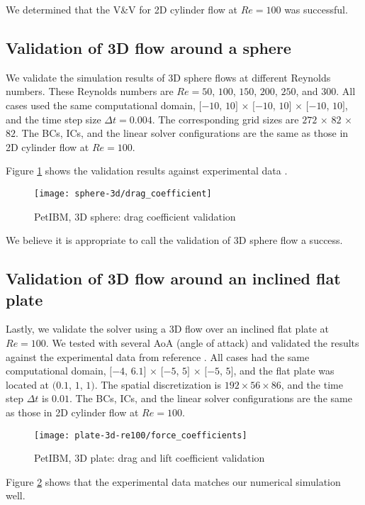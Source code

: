 We determined that the V\&V for 2D cylinder flow at $Re=100$ was successful.

\subsection*{Validation of 3D flow around a sphere}

We validate the simulation results of 3D sphere flows at different Reynolds numbers.
These Reynolds numbers are $Re=50$, $100$, $150$, $200$, $250$, and $300$.
All cases used the same computational domain, $[-10$, $10]$ $\times$ $[-10$, $10]$ $\times$ $[-10$, $10]$, and the time step size $\Delta t=0.004$.
The corresponding grid sizes are $272$ $\times$ $82$ $\times$ $82$.
The BCs, ICs, and the linear solver configurations are the same as those in 2D cylinder flow at $Re=100$.

Figure \ref{fig:petibm-sphere3d-drag-val} shows the validation results against experimental data \cite{clift_bubbles_2013,roos_experimental_1971}.
\begin{figure}[hbt!]
    \texttt{[image: sphere-3d/drag\_coefficient]}
    \caption[PetIBM, 3D sphere: drag coefficient validation]{
        PetIBM, 3D sphere: drag coefficient validation \cite{clift_bubbles_2013,roos_experimental_1971}
    }
    \label{fig:petibm-sphere3d-drag-val}
\end{figure}
We believe it is appropriate to call the validation of 3D sphere flow a success.

\subsection*{Validation of 3D flow around an inclined flat plate}

Lastly, we validate the solver using a 3D flow over an inclined flat plate at $Re=100$.
We tested with several AoA (angle of attack) and validated the results against the experimental data from reference \cite{taira_unsteadiness_2007}.
All cases had the same computational domain, $[-4$, $6.1]$ $\times$ $[-5$, $5]$ $\times$ $[-5$, $5]$, and the flat plate was located at $(0.1$, $1$, $1)$.
The spatial discretization is $192 \times 56 \times 86$, and the time step $\Delta t$ is $0.01$.
The BCs, ICs, and the linear solver configurations are the same as those in 2D cylinder flow at $Re=100$.

\begin{figure}[hbt!]
    \texttt{[image: plate-3d-re100/force\_coefficients]}
    \caption{PetIBM, 3D plate: drag and lift coefficient validation}
    \label{fig:petibm-plate3d-drag-lift-val}
\end{figure}
Figure \ref{fig:petibm-plate3d-drag-lift-val} shows that the experimental data matches our numerical simulation well.

